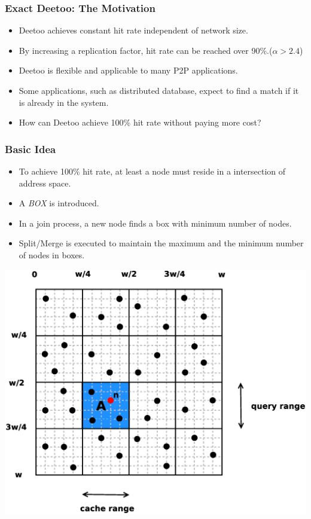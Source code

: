 \documentclass[red]{beamer}
\begin{document}
\begin{frame}
\frametitle{Exact Deetoo: The Motivation}
\begin{itemize}
\item Deetoo achieves constant hit rate independent of network size.
\item By increasing a replication factor, hit rate can be reached over 90\%.($\alpha > 2.4$)
\item Deetoo is flexible and applicable to many P2P applications.
\item Some applications, such as distributed database, expect to find a match if it is already in the system. 
\item How can Deetoo achieve 100\% hit rate without paying more cost?
\end{itemize}
\end{frame}

\begin{frame}
\frametitle{Basic Idea}
\begin{minipage}{5cm}
\begin{itemize}
\item To achieve 100\% hit rate, at least a node must reside in 
a intersection of address space.
\item A \textit{BOX} is introduced.
\item In a join process, a new node finds a box with minimum number of nodes.
\item Split/Merge is executed to maintain the maximum and the minimum number of nodes in boxes.
\end{itemize}
\end{minipage}
\begin{minipage}{5cm}
\centering
\includegraphics[scale=0.2]{figs/ed2_space}
\end{minipage}
\end{frame}
\end{document}
